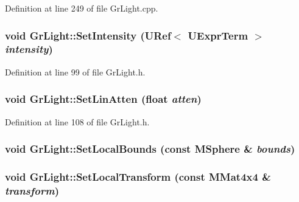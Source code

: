 Definition at line 249 of file GrLight.cpp.\hypertarget{class_gr_light_0ff00ad818e97416b1d63f6dba36a444}{
\subsubsection[{SetIntensity}]{\setlength{\rightskip}{0pt plus 5cm}void GrLight::SetIntensity ({\bf URef}$<$ {\bf UExprTerm} $>$ {\em intensity})}}
\label{class_gr_light_0ff00ad818e97416b1d63f6dba36a444}




Definition at line 99 of file GrLight.h.\hypertarget{class_gr_light_cbe776981b08fa29e2a7f864be4c95ee}{
\subsubsection[{SetLinAtten}]{\setlength{\rightskip}{0pt plus 5cm}void GrLight::SetLinAtten (float {\em atten})}}
\label{class_gr_light_cbe776981b08fa29e2a7f864be4c95ee}




Definition at line 108 of file GrLight.h.\hypertarget{class_gr_light_b3588c8d402aa2486233dbc258592909}{
\subsubsection[{SetLocalBounds}]{\setlength{\rightskip}{0pt plus 5cm}void GrLight::SetLocalBounds (const {\bf MSphere} \& {\em bounds})}}
\label{class_gr_light_b3588c8d402aa2486233dbc258592909}


\hypertarget{class_gr_light_60aa163bac55c7876a9c7280519788f4}{
\subsubsection[{SetLocalTransform}]{\setlength{\rightskip}{0pt plus 5cm}void GrLight::SetLocalTransform (const {\bf MMat4x4} \& {\em transform})}}
\label{class_gr_light_60aa163bac55c7876a9c7280519788f4}




